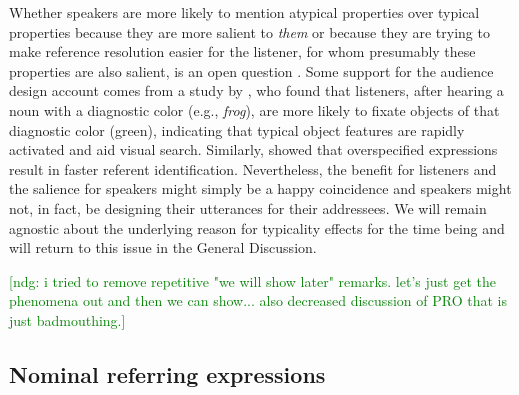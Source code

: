 \documentclass[11pt]{article}
\newcommand{\jd}[1]{\textcolor{Red}{[jd: #1]}}
\newcommand{\ndg}[1]{\textcolor{Green}{[ndg: #1]}}
\newcommand{\sectionref}[1]{Section \ref{#1}}
\begin{document}
Whether speakers are more likely to mention atypical properties over typical properties because they are more salient to \emph{them} or because they are trying to make reference resolution easier for the listener, for whom presumably these properties are also salient, is an open question \cite{Westerbeek2015}. Some support for the audience design account comes from a study by , who found that listeners, after hearing a noun with a diagnostic color (e.g., \emph{frog}), are more likely to fixate objects of that diagnostic color (green), indicating that typical object features are rapidly activated and aid visual search. Similarly,  showed that overspecified expressions result in faster referent identification.  Nevertheless, the benefit for listeners and the salience for speakers might simply be a happy coincidence and speakers might not, in fact, be designing their utterances for their addressees. We will remain agnostic about the underlying reason for typicality effects for the time being and will return to this issue in the General Discussion. %




\ndg{i tried to remove repetitive "we will show later" remarks. let's just get the phenomena out and then we can show... also decreased discussion of PRO that is just badmouthing.}

\subsection{Nominal referring expressions}
\label{sec:nominalintro}
\end{document}
